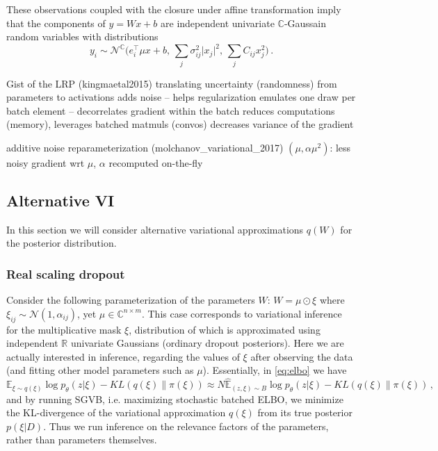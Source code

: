 \documentclass[a4paper,10pt]{article}
\newcommand{\real}{\mathbb{R}}
\newcommand{\cplx}{\mathbb{C}}
\begin{document}
These observations coupled with the closure under affine transformation imply
that the components of $y = W x + b$ are independent univariate $\cplx$-Gaussain
random variables with distributions
$$
y_i
  \sim \mathcal{N}^{\cplx}
    \bigl(
      e_i^\top \mu x + b,
      \, \sum_j \sigma^2_{ij} \lvert x_j \rvert^2,
      \, \sum_j C_{ij} x_j^2
    \bigr)
  \,. $$

Gist of the LRP (kingmaetal2015)
translating uncertainty (randomness) from parameters to activations
  adds noise -- helps regularization
  emulates one draw per batch element -- decorrelates gradient within the batch
  reduces computations (memory), leverages batched matmuls (convos)
  decreases variance of the gradient

additive noise reparameterization (molchanov\_variational\_2017) $(\mu, \alpha \mu^2)$:
  less noisy gradient wrt $\mu$, $\alpha$ recomputed on-the-fly


\subsection{Alternative VI} %
\label{sub:alternative_vi}

In this section we will consider alternative variational approximations $q(W)$ for
the posterior distribution.

\subsubsection{Real scaling dropout} %
\label{ssub:real_scaling_dropout}

Consider the following parameterization of the parameters $W$: $
  W = \mu \odot \xi
$ where $
  \xi_{ij} \sim \mathcal{N}(1, \alpha_{ij})
$, yet $\mu \in \cplx^{n \times m}$. This case corresponds to variational inference for
the multiplicative mask $\xi$, distribution of which is approximated using independent
$\real$ univariate Gaussians (ordinary dropout posteriors). Here we are actually
interested in inference, regarding the values of $\xi$ after observing the data (and
fitting other model parameters such as $\mu$). Essentially, in \eqref{eq:elbo}
we have
$$
\mathbb{E}_{\xi \sim q(\xi)}
  \log p_\theta(z \vert \xi)
  - KL(q(\xi) \| \pi(\xi))
  \approx
    N \hat{\mathbb{E}}_{(z, \xi) \sim B}
      \log p_\theta(z \vert \xi)
    - KL(q(\xi) \| \pi(\xi))
  \,, $$
and by running SGVB, i.e. maximizing stochastic batched ELBO, we minimize the KL-divergence
of the variational approximation $q(\xi)$ from its true posterior $p(\xi\vert D)$. Thus
we run inference on the relevance factors of the parameters, rather than parameters
themselves.
\end{document}

